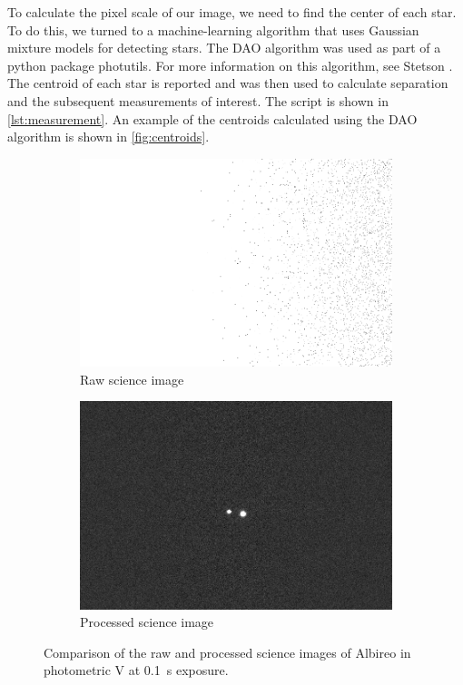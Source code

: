 \documentclass[%
aip,
jmp,
reprint,
floatfix,
]{revtex4-1}
\begin{document}
	To calculate the pixel scale of our image, we need to find the center of each star. To do this, we turned to a machine-learning algorithm that uses Gaussian mixture models for detecting stars. The DAO algorithm was used as part of a python package photutils. For more information on this algorithm, see Stetson \cite{1987PASP...99..191S}. The centroid of each star is reported and was then used to calculate separation and the subsequent measurements of interest. The script is shown in \autoref{lst:measurement}. An example of the centroids calculated using the DAO algorithm is shown in \autoref{fig:centroids}.
	
	\begin{figure}[]
		\begin{subfigure}{\linewidth}
			\centering
			\includegraphics[width=.8\linewidth]{figs/pre.png}
			\caption{Raw science image}
		\end{subfigure}
		\begin{subfigure}{\linewidth}
			\centering
			\includegraphics[width=.8\linewidth]{figs/post.png}
			\caption{Processed science image}
		\end{subfigure}
		\caption{Comparison of the raw and processed science images of Albireo in photometric V at \SI{0.1}{\second} exposure.}
		\label{fig:comparison}
	\end{figure}
\end{document}
